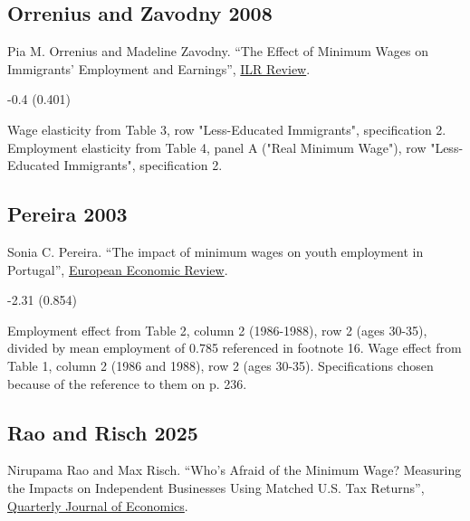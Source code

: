 \subsection*{Orrenius and Zavodny 2008}
\vspace{-0.7em}

\noindent Pia M. Orrenius and Madeline Zavodny. ``The Effect of Minimum Wages on Immigrants' Employment and Earnings'', \href{https://doi.org/10.1177/001979390806100406}{ILR Review}.

\vspace{0.7em}

 -0.4 (0.401)

\vspace{0.7em}

 Wage elasticity from Table 3, row "Less-Educated Immigrants", specification 2. Employment elasticity from Table 4, panel A ("Real Minimum Wage"), row "Less-Educated Immigrants", specification 2.

\subsection*{Pereira 2003}
\vspace{-0.7em}

\noindent Sonia C. Pereira. ``The impact of minimum wages on youth employment in Portugal'', \href{https://doi.org/10.1016/S0014-2921(02)00209-X}{European Economic Review}.

\vspace{0.7em}

 -2.31 (0.854)

\vspace{0.7em}

 Employment effect from Table 2, column 2 (1986-1988), row 2 (ages 30-35), divided by mean employment of 0.785 referenced in footnote 16. Wage effect from Table 1, column 2 (1986 and 1988), row 2 (ages 30-35). Specifications chosen because of the reference to them on p. 236.

\subsection*{Rao and Risch 2025}
\vspace{-0.7em}

\noindent Nirupama Rao and Max Risch. ``Who's Afraid of the Minimum Wage? Measuring the Impacts on Independent Businesses Using Matched U.S. Tax Returns'', \href{https://drive.google.com/file/d/1T1F-w9R3zekptwkMQ2yMWUw7JhMPMW9_/}{Quarterly Journal of Economics}.

